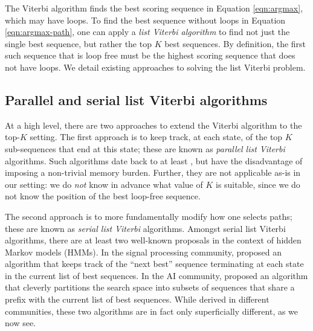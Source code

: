 

The Viterbi algorithm %
finds the best scoring sequence in Equation \ref{eqn:argmax}, which may have loops.
To find the best sequence without loops in Equation \ref{eqn:argmax-path}, one can apply a \emph{list Viterbi algorithm}
to find not just the single best sequence,
but rather the top $K$ best sequences.
By definition, the first such sequence that is loop free must be the highest scoring sequence that does not have loops.
We detail existing approaches to solving the list Viterbi problem.

%
\subsection{Parallel and serial list Viterbi algorithms}

At a high level, there are two approaches to extend the Viterbi algorithm to the top-$K$ setting.
The first approach is to keep track, at each state, of the top $K$ sub-sequences that end at this state; these are known as \emph{parallel list Viterbi} algorithms.
Such algorithms date back to at least \citet{Forney:1973},
but have the disadvantage of imposing a non-trivial memory burden.
Further, they are not applicable as-is in our setting:
we do \emph{not} know in advance what value of $K$ is suitable,
since we do not know the position of the best loop-free sequence.

The second approach is to more fundamentally modify how one selects paths; these are known as \emph{serial list Viterbi} algorithms.
Amongst serial list Viterbi algorithms, there are at least two well-known proposals in the context of hidden Markov models (HMMs).
In the signal processing community, \citet{seshadri1994list} proposed an algorithm that keeps track of the ``next best'' sequence terminating at each state in the current list of best sequences.
In the AI community, \citet{nilsson2001sequentially}
proposed an algorithm that cleverly partitions the search space into subsets of sequences that share a prefix with the current list of best sequences.
While derived in different communities, these two algorithms are in fact only superficially different, as we now see.

